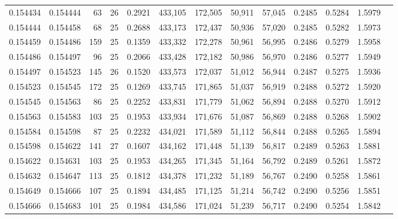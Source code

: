 \begin{tabular}{rrrrrrrrrrrrr}
0.154434 & 0.154444 &  63 &  26 &                                     0.2921 & 433,105 & 172,505 &  50,911 &  57,045 & 0.2485 & 0.5284 & 1.5979 \\
0.154444 & 0.154458 &  68 &  25 &                                     0.2688 & 433,173 & 172,437 &  50,936 &  57,020 & 0.2485 & 0.5282 & 1.5973 \\
0.154459 & 0.154486 & 159 &  25 &                                     0.1359 & 433,332 & 172,278 &  50,961 &  56,995 & 0.2486 & 0.5279 & 1.5958 \\
0.154486 & 0.154497 &  96 &  25 &                                     0.2066 & 433,428 & 172,182 &  50,986 &  56,970 & 0.2486 & 0.5277 & 1.5949 \\
0.154497 & 0.154523 & 145 &  26 &                                     0.1520 & 433,573 & 172,037 &  51,012 &  56,944 & 0.2487 & 0.5275 & 1.5936 \\
0.154523 & 0.154545 & 172 &  25 &                                     0.1269 & 433,745 & 171,865 &  51,037 &  56,919 & 0.2488 & 0.5272 & 1.5920 \\
0.154545 & 0.154563 &  86 &  25 &                                     0.2252 & 433,831 & 171,779 &  51,062 &  56,894 & 0.2488 & 0.5270 & 1.5912 \\
0.154563 & 0.154583 & 103 &  25 &                                     0.1953 & 433,934 & 171,676 &  51,087 &  56,869 & 0.2488 & 0.5268 & 1.5902 \\
0.154584 & 0.154598 &  87 &  25 &                                     0.2232 & 434,021 & 171,589 &  51,112 &  56,844 & 0.2488 & 0.5265 & 1.5894 \\
0.154598 & 0.154622 & 141 &  27 &                                     0.1607 & 434,162 & 171,448 &  51,139 &  56,817 & 0.2489 & 0.5263 & 1.5881 \\
0.154622 & 0.154631 & 103 &  25 &                                     0.1953 & 434,265 & 171,345 &  51,164 &  56,792 & 0.2489 & 0.5261 & 1.5872 \\
0.154632 & 0.154647 & 113 &  25 &                                     0.1812 & 434,378 & 171,232 &  51,189 &  56,767 & 0.2490 & 0.5258 & 1.5861 \\
0.154649 & 0.154666 & 107 &  25 &                                     0.1894 & 434,485 & 171,125 &  51,214 &  56,742 & 0.2490 & 0.5256 & 1.5851 \\
0.154666 & 0.154683 & 101 &  25 &                                     0.1984 & 434,586 & 171,024 &  51,239 &  56,717 & 0.2490 & 0.5254 & 1.5842 \\

\end{tabular}
